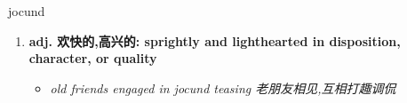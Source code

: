
\begin{frame}
{\huge jocund}
\begin{center}
\begin{enumerate}\Large
  \item \textbf{adj. 欢快的,高兴的: sprightly and lighthearted in disposition, character, or quality}
  \begin{itemize}
    \item \em{\Large{old friends engaged in jocund teasing 老朋友相见,互相打趣调侃}}
  \end{itemize}
\end{enumerate}
\end{center}
\end{frame}
